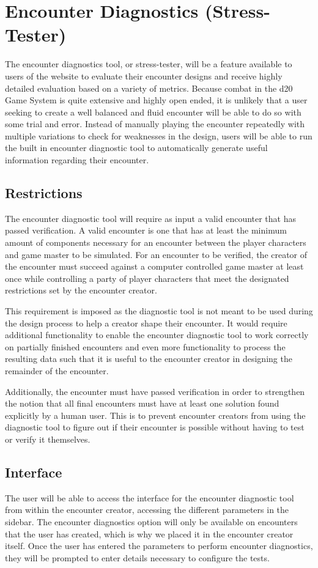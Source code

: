 \documentclass[12pt,a4paper]{report}
\begin{document}
	\section{Encounter Diagnostics (Stress-Tester)}
	The encounter diagnostics tool, or stress-tester, will be a feature available to users of the website to evaluate their encounter designs and receive highly detailed evaluation based on a variety of metrics. Because combat in the d20 Game System is quite extensive and highly open ended, it is unlikely that a user seeking to create a well balanced and fluid encounter will be able to do so with some trial and error. Instead of manually playing the encounter repeatedly with multiple variations to check for weaknesses in the design, users will be able to run the built in encounter diagnostic tool to automatically generate useful information regarding their encounter. 
	
		\subsection{Restrictions}
		The encounter diagnostic tool will require as input a valid encounter that has passed verification. A valid encounter is one that has at least the minimum amount of components necessary for an encounter between the player characters and game master to be simulated. For an encounter to be verified, the creator of the encounter must succeed against a computer controlled game master at least once while controlling a party of player characters that meet the designated restrictions set by the encounter creator.  
		
		This requirement is imposed as the diagnostic tool is not meant to be used during the design process to help a creator shape their encounter. It would require additional functionality to enable the encounter diagnostic tool to work correctly on partially finished encounters and even more functionality to process the resulting data such that it is useful to the encounter creator in designing the remainder of the encounter. 
		
		Additionally, the encounter must have passed verification in order to strengthen the notion that all final encounters must have at least one solution found explicitly by a human user. This is to prevent encounter creators from using the diagnostic tool to figure out if their encounter is possible without having to test or verify it themselves. 
		\subsection{Interface}
		The user will be able to access the interface for the encounter diagnostic tool from within the encounter creator, accessing the different parameters in the sidebar. The encounter diagnostics option will only be available on encounters that the user has created, which is why we placed it in the encounter creator itself. Once the user has entered the parameters to perform encounter diagnostics, they will be prompted to enter details necessary to configure the tests.
		
\end{document}
